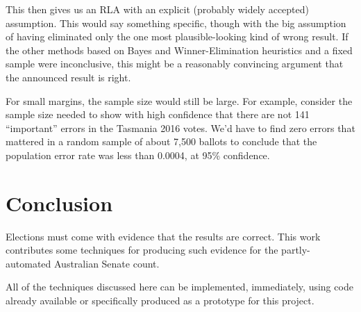 \documentclass[10pt,a4paper]{article}
\newcommand{\VTNote}[1]{}
\begin{document}
{\VTNote{
Then all we need is a way to tally up errors which all count somewhere between 0 and $1/qM$ towards the same margin.  Can I adapt MACRO from ``Conservative statistical post-election audits''? Or is there a reason that multiple-voting doesn't necessarily correspond to different magnitudes of shift?}

This then gives us an RLA with an explicit (probably widely accepted) assumption.  This would say something specific, though with the big assumption of having eliminated only the one most plausible-looking kind of wrong result.  If the other methods based on Bayes and Winner-Elimination heuristics and a fixed sample were inconclusive, this might be a reasonably convincing argument that the announced result is right.  

For small margins, the sample size would still be large.  
For example, consider the sample size needed to show with high confidence that there are not 141 ``important'' errors in the Tasmania 2016 votes.
We'd have to find zero errors that mattered in a random sample of about 7,500 ballots to conclude that the population error rate was less than 0.0004, at 95\% confidence.
}%

\section{Conclusion}
Elections must come with evidence that the results are correct.  This work contributes some techniques for producing such evidence for the partly-automated Australian Senate count.

All of the techniques discussed here can be implemented, immediately, using code already available or specifically produced as a prototype for this project.
\end{document}
